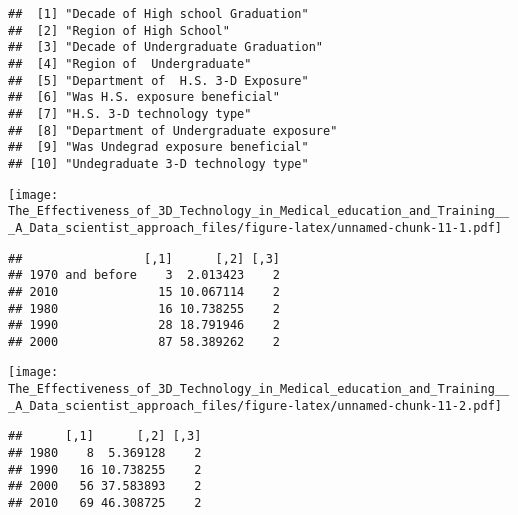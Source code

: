 \documentclass[]{article}
\newenvironment{Shaded}{\begin{snugshade}}{\end{snugshade}}
\newcommand{\CommentTok}[1]{\textcolor[rgb]{0.56,0.35,0.01}{\textit{#1}}}
\newcommand{\DataTypeTok}[1]{\textcolor[rgb]{0.13,0.29,0.53}{#1}}
\newcommand{\KeywordTok}[1]{\textcolor[rgb]{0.13,0.29,0.53}{\textbf{#1}}}
\newcommand{\NormalTok}[1]{#1}
\newcommand{\OperatorTok}[1]{\textcolor[rgb]{0.81,0.36,0.00}{\textbf{#1}}}
\newcommand{\StringTok}[1]{\textcolor[rgb]{0.31,0.60,0.02}{#1}}
\begin{document}
\begin{verbatim}
##  [1] "Decade of High school Graduation"    
##  [2] "Region of High School"               
##  [3] "Decade of Undergraduate Graduation"  
##  [4] "Region of  Undergraduate"            
##  [5] "Department of  H.S. 3-D Exposure"    
##  [6] "Was H.S. exposure beneficial"        
##  [7] "H.S. 3-D technology type"            
##  [8] "Department of Undergraduate exposure"
##  [9] "Was Undegrad exposure beneficial"    
## [10] "Undegraduate 3-D technology type"
\end{verbatim}

\begin{Shaded}
\end{Shaded}

\texttt{[image: The\_Effectiveness\_of\_3D\_Technology\_in\_Medical\_education\_and\_Training\_\_\_A\_Data\_scientist\_approach\_files/figure-latex/unnamed-chunk-11-1.pdf]}

\begin{verbatim}
##                 [,1]      [,2] [,3]
## 1970 and before    3  2.013423    2
## 2010              15 10.067114    2
## 1980              16 10.738255    2
## 1990              28 18.791946    2
## 2000              87 58.389262    2
\end{verbatim}

\begin{Shaded}
\end{Shaded}

\texttt{[image: The\_Effectiveness\_of\_3D\_Technology\_in\_Medical\_education\_and\_Training\_\_\_A\_Data\_scientist\_approach\_files/figure-latex/unnamed-chunk-11-2.pdf]}

\begin{verbatim}
##      [,1]      [,2] [,3]
## 1980    8  5.369128    2
## 1990   16 10.738255    2
## 2000   56 37.583893    2
## 2010   69 46.308725    2
\end{verbatim}

\begin{Shaded}
\end{Shaded}
\end{document}
